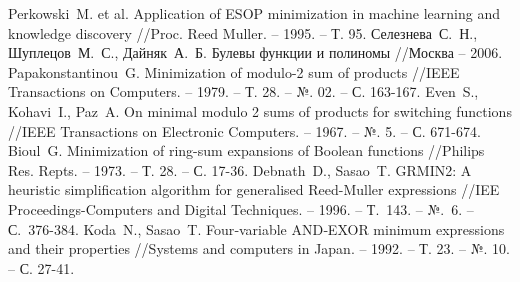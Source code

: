 \documentclass[a4paper,12pt,titlepage]{article}
\begin{document}
\begin{raggedright}
\begin{thebibliography}{99}
         Perkowski~M. et al. Application of ESOP minimization in machine learning and knowledge discovery //Proc. Reed Muller. – 1995. – Т. 95.
         Селезнева~С.~Н., Шуплецов~М.~С., Дайняк~А.~Б. Булевы функции и полиномы //Москва – 2006.
         Papakonstantinou~G. Minimization of modulo-2 sum of products //IEEE Transactions on Computers. – 1979. – Т. 28. – №. 02. – С. 163-167.
         Even~S., Kohavi~I., Paz~A. On minimal modulo 2 sums of products for switching functions //IEEE Transactions on Electronic Computers. – 1967. – №. 5. – С. 671-674.
         Bioul~G. Minimization of ring-sum expansions of Boolean functions //Philips Res. Repts. – 1973. – Т. 28. – С. 17-36.
         Debnath~D., Sasao~T. GRMIN2: A heuristic simplification algorithm for generalised Reed-Muller expressions //IEE Proceedings-Computers and Digital Techniques. – 1996. – Т.~143. – №.~6. – С.~376-384.
         Koda~N., Sasao~T. Four‐variable AND‐EXOR minimum expressions and their properties //Systems and computers in Japan. – 1992. – Т. 23. – №. 10. – С. 27-41.
    \end{thebibliography}
\end{raggedright}
\end{document}
